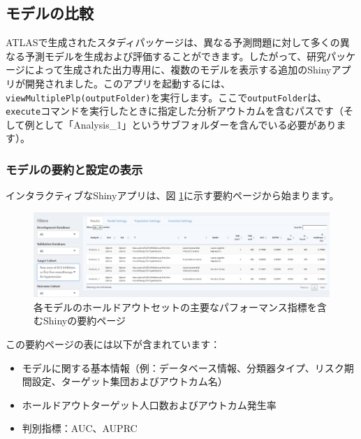 \documentclass[
  11pt]{book}
\providecommand{\tightlist}{%
  \setlength{\itemsep}{0pt}\setlength{\parskip}{0pt}}
\theoremstyle{definition}
\theoremstyle{definition}
\theoremstyle{definition}
\theoremstyle{definition}
\theoremstyle{remark}
\begin{document}
\subsection{モデルの比較}\label{ux30e2ux30c7ux30ebux306eux6bd4ux8f03}

ATLASで生成されたスタディパッケージは、異なる予測問題に対して多くの異なる予測モデルを生成および評価することができます。したがって、研究パッケージによって生成された出力専用に、複数のモデルを表示する追加のShinyアプリが開発されました。このアプリを起動するには、\texttt{viewMultiplePlp(outputFolder)}を実行します。ここで\texttt{outputFolder}は、\texttt{execute}コマンドを実行したときに指定した分析アウトカムを含むパスです（そして例として「Analysis\_1」というサブフォルダーを含んでいる必要があります）。

\subsubsection*{モデルの要約と設定の表示}\label{ux30e2ux30c7ux30ebux306eux8981ux7d04ux3068ux8a2dux5b9aux306eux8868ux793a}

インタラクティブなShinyアプリは、図 \ref{fig:multiShinySummary}に示す要約ページから始まります。

\begin{figure}

{\centering \includegraphics[width=1\linewidth]{images/PatientLevelPrediction/shiny/shinyFilter} 

}

\caption{各モデルのホールドアウトセットの主要なパフォーマンス指標を含むShinyの要約ページ}\label{fig:multiShinySummary}
\end{figure}

この要約ページの表には以下が含まれています：

\begin{itemize}
\tightlist
\item
  モデルに関する基本情報（例：データベース情報、分類器タイプ、リスク期間設定、ターゲット集団およびアウトカム名）
\item
  ホールドアウトターゲット人口数およびアウトカム発生率
\item
  判別指標：AUC、AUPRC
\end{itemize}
\end{document}

